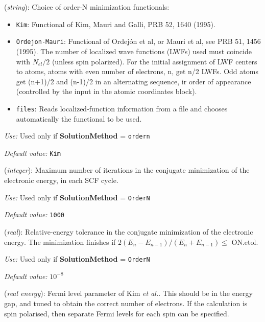 \begin{description}
\itemsep 10pt
\parsep 0pt
\item[\textbf{ON.functional}] (\textit{string}):
Choice of order-N minimization functionals:
\begin{itemize}
\item \texttt{Kim}:
Functional of Kim, Mauri and Galli, PRB 52, 1640 (1995).
\item \texttt{Ordejon-Mauri}:
Functional of Ordej\'on et al, or Mauri et al, see PRB 51, 1456 (1995).
The number of localized wave functions (LWFs) used must coincide with
$N_{el}/2$ (unless spin polarized).
For the initial assignment of LWF centers to atoms, atoms
with even number of electrons, n, get n/2 LWFs. Odd atoms
get (n+1)/2 and (n-1)/2 in an alternating sequence, ir order
of appearance (controlled by the input in the atomic coordinates block).

\item \texttt{files}:
Reads localized-function information from a file and
chooses automatically the functional to be used.
\end{itemize}

\textit{Use:} Used only if \textbf{SolutionMethod} = \texttt{ordern}

\textit{Default value:} \texttt{Kim}

\item[\textbf{ON.MaxNumIter}] (\textit{integer}):
Maximum number of iterations
in the conjugate minimization of the electronic
energy, in each SCF cycle.

\textit{Use:} Used only if \textbf{SolutionMethod} = \texttt{OrderN}

\textit{Default value:} \texttt{1000}

\item[\textbf{ON.etol}] (\textit{real}):
Relative-energy tolerance in the conjugate minimization of the electronic
energy. The minimization finishes if
\hspace{0.2truecm} $2 (E_n - E_{n-1}) / (E_n + E_{n-1}) \leq $ ON.etol.

\textit{Use:} Used only if \textbf{SolutionMethod} = \texttt{OrderN}

\textit{Default value:} $10^{-8}$

\item[\textbf{ON.eta}] (\textit{real energy}):
Fermi level parameter of Kim
\textit{et al.}. This should be in the energy gap, and tuned to obtain
the correct number of electrons. If the calculation is spin polarised,
then separate Fermi levels for each spin can be specified.


\end{description}

